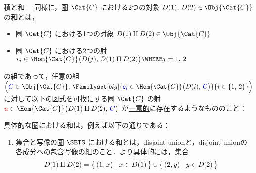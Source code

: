 \documentclass[TQFT_main]{subfiles}
\begin{document}
\begin{myexample}[label=def:product-coproduct]{積と和}
    　同様に，圏 $\Cat{C}$ における2つの対象 $D(1),\, D(2) \in \Obj{\Cat{C}}$ の\textbf{和}とは，
    \begin{itemize}
        \item 圏 $\Cat{C}$ における1つの対象 $D(1) \amalg D(2) \in \Obj{\Cat{C}}$
        \item 圏 $\Cat{C}$ における2つの射 $i_j \in \Hom{\Cat{C}} \bigl( D(j),\, D(1) \amalg D(2) \bigr) \WHERE j=1,\, 2$
    \end{itemize}
    の組であって，任意の組 $\Bigl( \textcolor{blue}{C} \in \Obj{\Cat{C}},\, \Familyset[big]{\textcolor{blue}{c_i} \in \Hom{\Cat{C}} \bigl( D(i),\, \textcolor{blue}{C} \bigr)}{i \in \{1,\, 2\}} \Bigr)$ に対して以下の図式を可換にする圏 $\Cat{C}$ の射 $\textcolor{red}{u} \in \Hom{\Cat{C}} \bigl(D(1)\amalg D(2),\, \textcolor{blue}{C} \bigr)$ が\underline{一意的}に存在するようなもののこと：
    \begin{center}
    \end{center}
    具体的な圏における和は，例えば以下の通りである：
    \begin{enumerate}
        \item 集合と写像の圏 $\SETS$ における和とは，disjoint unionと，disjoint unionの各成分への包含写像の組のこと．より具体的には，集合
        \begin{align}
            D(1) \amalg D(2) &= \bigl\{\, (1,\, x) \bigm| x \in D(1) \,\bigr\} \cup \bigl\{\, (2, y) \bigm| y \in D(2) \,\bigr\}

\end{align}
\end{enumerate}
\end{myexample}
\end{document}
